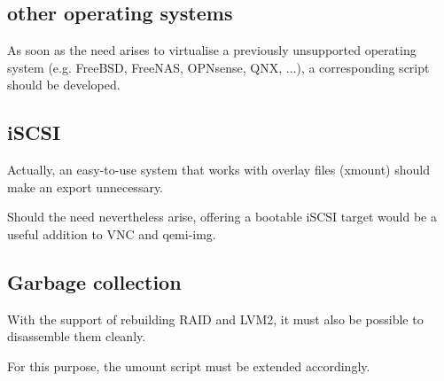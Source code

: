 \subsection{other operating systems}

As soon as the need arises to virtualise a previously unsupported operating system (e.g. FreeBSD, FreeNAS, OPNsense, QNX, ...), a corresponding script should be developed.

\subsection{iSCSI}

Actually, an easy-to-use system that works with overlay files (xmount) should make an export unnecessary.

Should the need nevertheless arise, offering a bootable iSCSI target would be a useful addition to VNC and qemi-img.

\subsection{Garbage collection}

With the support of rebuilding RAID and LVM2, it must also be possible to disassemble them cleanly.

For this purpose, the umount script must be extended accordingly.
